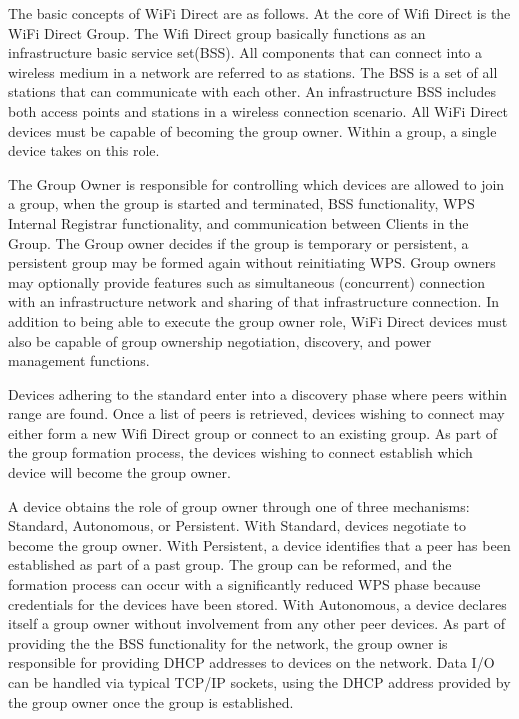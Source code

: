 \documentclass[10pt,twocolumn]{article}
\begin{document}
The basic concepts of WiFi Direct are as follows. 
At the core of Wifi Direct is the WiFi Direct Group. 
The Wifi Direct group basically functions as an infrastructure basic service set(BSS). 
All components that can connect into a wireless medium in a network are referred to as stations. 
The BSS is a set of all stations that can communicate with each other. 
An infrastructure BSS includes both access points and stations in a wireless connection scenario.\cite{wirelesslanwiki}
All WiFi Direct devices must be capable of becoming the group owner. 
Within a group, a single device takes on this role.
 
The Group Owner is responsible for controlling which devices are allowed to join a group, when the group is started and terminated, BSS functionality, WPS Internal Registrar functionality, and communication between Clients in the Group. 
The Group owner decides if the group is temporary or persistent, a persistent group may be formed again without reinitiating WPS.
Group owners may optionally provide features such as simultaneous (concurrent) connection with an infrastructure network and sharing of that infrastructure connection. 
In addition to being able to execute the group owner role, WiFi Direct devices must also be capable of group ownership negotiation, discovery, and power management functions.
 
Devices adhering to the standard enter into a discovery phase where peers within range are found. 
Once a list of peers is retrieved, devices wishing to connect may either form a new  Wifi Direct group or connect to an existing group. 
As part of the group formation process, the devices wishing to connect establish which device will become the group owner.

A device obtains the role of group owner through one of three mechanisms: Standard, Autonomous, or Persistent. 
With Standard, devices negotiate to become the group owner.
With Persistent, a device identifies that a peer has been established as part of a past group. 
The group can be reformed, and the formation process can occur with a significantly reduced WPS phase because credentials for the devices have been stored.
With Autonomous, a device declares itself a group owner without involvement from any other peer devices. 
As part of providing the the BSS functionality for the network, the group owner is responsible for providing DHCP addresses to devices on the network.
Data I/O can be handled via typical TCP/IP sockets, using the DHCP address provided by the group owner once the group is established\cite{wifiwhitepaper}.
\end{document}
